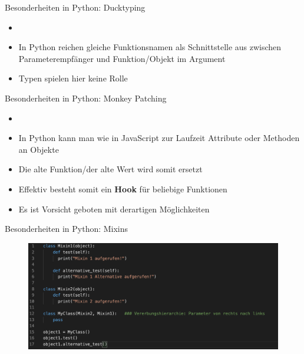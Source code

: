 \begin{frame}{Besonderheiten in Python: Ducktyping}
  \begin{itemize}
        \setlength{\itemindent}{1.2in}
        \item [\textbf{Recap: Ducktyping}]
    \end{itemize}

    \begin{itemize}
        \item In Python reichen gleiche Funktionsnamen als Schnittstelle aus zwischen Parameterempfänger und Funktion/Objekt im Argument
        \item Typen spielen hier keine Rolle
    \end{itemize}

  \end{frame}


\begin{frame}{Besonderheiten in Python: Monkey Patching }
  \begin{itemize}
        \setlength{\itemindent}{1.1in}
        \item [\textbf{Monkey Patching}]
    \end{itemize}

    \begin{itemize}
        \item In Python kann man wie in JavaScript zur Laufzeit Attribute oder Methoden an Objekte 
        \item Die alte Funktion/der alte Wert wird somit ersetzt
        \item Effektiv besteht somit ein \textbf{Hook} für beliebige Funktionen
        \item Es ist Vorsicht geboten mit derartigen Möglichkeiten
    \end{itemize}

  \end{frame}


\begin{frame}{Besonderheiten in Python: Mixins}
   \begin{figure}[!htb]
        \includegraphics[scale=0.37]{07-python3/img/mixins}  %
    \end{figure}

  \end{frame}


